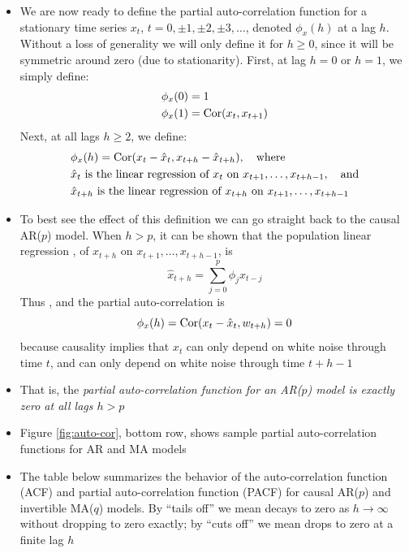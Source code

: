 \documentclass{article}
\begin{document}
\begin{itemize}
\item We are now ready to define the partial auto-correlation function for a
  stationary time series $x_t$, $t = 0, \pm 1, \pm 2, \pm 3, \dots$, denoted
  $\phi_x(h)$ at a lag $h$. Without a loss of generality we will only define it
  for $h \geq 0$, since it will be symmetric around zero (due to stationarity). 
  First, at lag $h=0$ or $h=1$, we simply define: 
  \begin{align*}
  \phi_x(0) &= 1 \\
  \phi_x(1) &= \operatorname{Cor}(x_t, x_{t+1}) 
  \end{align*}
  Next, at all lags $h \geq 2$, we define: 
  \begin{align*}
  &\phi_x(h) = \operatorname{Cor}(x_t - \hat{x}_t, x_{t+h} - \hat{x}_{t+h}), \quad
    \text{where} \\ 
  &\text{$\hat{x}_t$ is the linear regression of $x_t$ on
    $x_{t+1},\dots,x_{t+h-1}$}, \quad \text{and} \\ 
  &\text{$\hat{x}_{t+h}$ is the linear regression of $x_{t+h}$ on 
    $x_{t+1},\dots,x_{t+h-1}$}  
  \end{align*}

\item To best see the effect of this definition we can go straight back to the
  causal AR($p$) model. When $h>p$, it can be shown that the population linear 
  regression , of $x_{t+h}$ on $x_{t+1},\dots,x_{t+h-1}$, 
  is 
  \[
  \hat{x}_{t+h} = \sum_{j=0}^p \phi_j x_{t-j}
  \]
  Thus , and the partial auto-correlation is
  \[
  \phi_x(h) = \operatorname{Cor}(x_t - \hat{x}_t, w_{t+h}) = 0
  \]
  because causality implies that $x_t$ can only depend on white noise through
  time $t$, and  can only depend on white noise through time
  $t+h-1$ 

\item That is, the \emph{partial auto-correlation function for an AR($p$) model
  is exactly zero at all lags $h > p$}

\item Figure \ref{fig:auto-cor}, bottom row, shows sample partial
  auto-correlation functions for AR and MA models

\item The table below summarizes the behavior of the auto-correlation function
  (ACF) and partial auto-correlation function (PACF) for causal AR($p$) and
  invertible MA($q$) models. By ``tails off'' we mean decays to zero as $h \to
  \infty$ without dropping to zero exactly; by ``cuts off'' we mean drops to
  zero at a finite lag $h$


\end{itemize}
\end{document}
